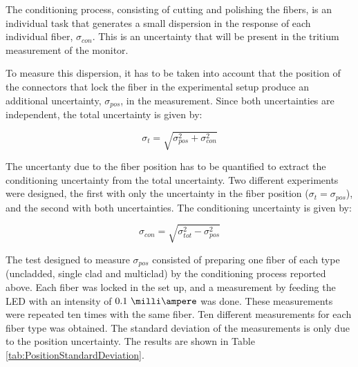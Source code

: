 The conditioning process, consisting of cutting and polishing the fibers, is an individual task that generates a small dispersion in the response of each individual fiber, $\sigma_{con}$. This is an uncertainty that will be present in the tritium measurement of the monitor.


To measure this dispersion, it has to be taken into account that the position of the connectors that lock the fiber in the experimental setup produce an additional uncertainty, $\sigma_{pos}$, in the measurement. Since both uncertainties are independent, the total uncertainty is given by:

\begin{equation}
\sigma_{t} = \sqrt{\sigma^2_{pos} + \sigma^2_{con} }
\label{eq:TotalUncertaintyFiberCharacterization}
\end{equation}

The uncertanty due to the fiber position has to be quantified to extract the conditioning uncertainty from the total uncertainty. Two different experiments were designed, the first with only the uncertainty in the fiber position ($\sigma_{t} = \sigma_{pos}$), and the second with both uncertainties. The conditioning uncertainty is given by:

\begin{equation}
\sigma_{con} = \sqrt{\sigma^2_{tot} - \sigma^2_{pos} }
\label{eq:ConditioningUncertaintyFiberCharacterization}
\end{equation}

The test designed to measure $\sigma_{pos}$ consisted of preparing one fiber of each type (uncladded, single clad and multiclad) by the conditioning process reported above. Each fiber was locked in the set up, and a measurement by feeding the LED with an intensity of $0.1~\milli\ampere$  was done. These measurements were repeated ten times with the same fiber. Ten different measurements for each fiber type was obtained. The standard deviation of the measurements is only due to the position uncertainty. The results are shown in Table \ref{tab:PositionStandardDeviation}.

